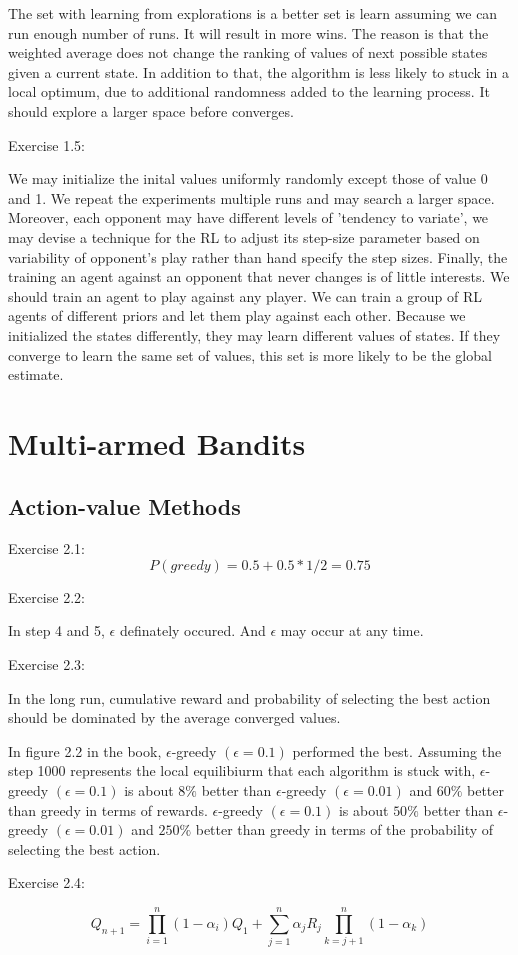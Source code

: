 \documentclass[11pt,a4paper]{report}
\begin{document}
The set with learning from explorations is a better set is learn assuming we can run enough number of runs. It will result in more wins. The reason is that the weighted average does not change the ranking of values of next possible states given a current state. In addition to that, the algorithm is less likely to stuck in a local optimum, due to additional randomness added to the learning process. It should explore a larger space before converges.

Exercise 1.5:

We may initialize the inital values uniformly randomly except those of value 0 and 1. We repeat the experiments multiple runs and may search a larger space.
Moreover, each opponent may have different levels of 'tendency to variate', we may devise a technique for the RL to adjust its step-size parameter based on variability of opponent's play rather than hand specify the step sizes.
Finally, the training an agent against an opponent that never changes is of little interests. We should train an agent to play against any player. We can train a group of RL agents of different priors and let them play against each other. Because we initialized the states differently, they may learn different values of states. If they converge to learn the same set of values, this set is more likely to be the global estimate.




\chapter{Multi-armed Bandits}
\section{Action-value Methods}%
\label{sec:Action-value Methods}
Exercise 2.1:
$$P(greedy) = 0.5 + 0.5 * 1/2 = 0.75$$


Exercise 2.2:

In step 4 and 5, $\epsilon$ definately occured.
And $\epsilon$ may occur at any time.

Exercise 2.3:

In the long run, cumulative reward and probability of selecting the best action should be dominated by the average converged values.

In figure 2.2 in the book, $\epsilon$-greedy $(\epsilon = 0.1)$  performed the best.
Assuming the step 1000 represents the local equilibiurm that each algorithm is stuck with,
$\epsilon$-greedy $(\epsilon = 0.1)$ is about $ 8\% $ better than $\epsilon$-greedy $(\epsilon = 0.01)$ and $60\%$ better than greedy in terms of rewards. 
$\epsilon$-greedy $(\epsilon = 0.1)$ is about $ 50\% $ better than $\epsilon$-greedy $(\epsilon = 0.01)$ and $250\%$ better than greedy in terms of the probability of selecting the best action. 

Exercise 2.4:

$$ Q_{n+1} = \prod_{i=1}^{n} (1-\alpha_i) Q_1 + \sum_{j=1}^n \alpha_j R_j \prod_{k=j+1}^n (1-\alpha_k) $$
\end{document}
